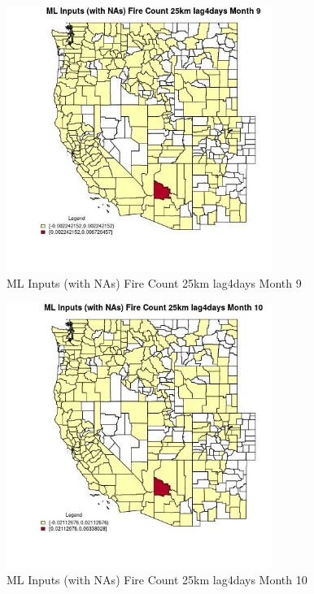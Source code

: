 \clearpage 

\begin{figure} 
\centering  
\includegraphics[width=0.77\textwidth]{Code_Outputs/Report_ML_input_PM25_Step4_part_e_de_duplicated_aves_compiled_2019-05-21wNAs_CountyFire_Count_25km_lag4daysmedianMonth9.jpg} 
\caption{\label{fig:Report_ML_input_PM25_Step4_part_e_de_duplicated_aves_compiled_2019-05-21wNAsCountyFire_Count_25km_lag4daysmedianMonth9}ML Inputs (with NAs) Fire Count 25km lag4days Month 9} 
\end{figure} 
 

\begin{figure} 
\centering  
\includegraphics[width=0.77\textwidth]{Code_Outputs/Report_ML_input_PM25_Step4_part_e_de_duplicated_aves_compiled_2019-05-21wNAs_CountyFire_Count_25km_lag4daysmedianMonth10.jpg} 
\caption{\label{fig:Report_ML_input_PM25_Step4_part_e_de_duplicated_aves_compiled_2019-05-21wNAsCountyFire_Count_25km_lag4daysmedianMonth10}ML Inputs (with NAs) Fire Count 25km lag4days Month 10} 
\end{figure} 
 

